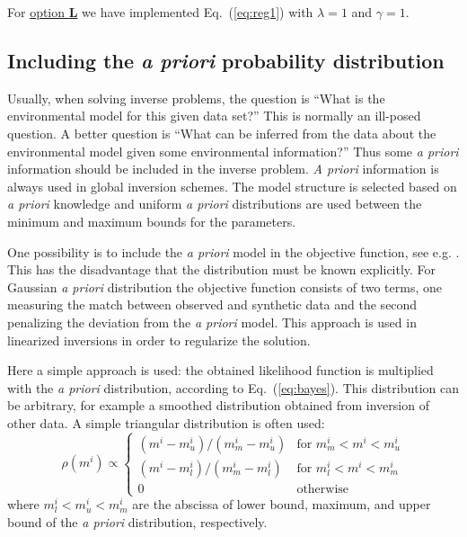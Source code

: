 \documentclass{saclantc}
\begin{document}
For \underline{option {\bf L}} we have implemented Eq.\ (\ref{eq:reg1}) with  $ \lambda=1$
  and $ \gamma=1$.

\subsection{Including the  {\it a priori} probability distribution}
\label{se:prior}


Usually, when solving inverse problems, the question is ``What is the
environmental model  for this given data set?'' This is normally an ill-posed
question. 
A better question is ``What can be inferred from the
data about the environmental model given some environmental
information?'' Thus 
 some {\it a priori} information should be included in the inverse problem. 
{\it A priori} information is always used in global inversion
schemes. The
model structure is selected based on {\it a
priori} knowledge and uniform {\it a priori}
distributions are used between the minimum and maximum bounds for the
parameters.

One possibility is to include the {\it a priori}  model in the objective
function, see e.g. \cite{tarantola,rajan:asa92}. This has the
disadvantage that the distribution must be known explicitly. 
For Gaussian {\it a priori} distribution  the objective function
consists of two terms, one measuring the match between observed and
 synthetic data and the second 
penalizing  the deviation from the {\it a priori} model. This approach
is  used in linearized inversions in order to regularize the solution.


Here  a  simple approach is used: the obtained likelihood function
is multiplied with the {\it a priori} distribution, according to
Eq.~(\ref{eq:bayes}). This
distribution can be arbitrary, for example a smoothed distribution obtained
from inversion of other data. 
A simple triangular distribution is often used:
\begin{equation}
\rho( m^i) \propto
\left\{ 
 \begin{array}{ll}
 ({m^i - m^i_u})/({m^i_m - m^i_u})  & \mbox{for $m^i_m < m^i < m^i_u$}\\ 
 ({m^i - m^i_l})/({m^i_m - m^i_l})  & \mbox{for $m^i_l < m^i < m^i_m$}\\ 
 0 & \mbox{otherwise} 
 \end{array}
\right. 
\label{eq:apri}
\end{equation}
where $m^i_l < m^i_u < m^i_m$ are the abscissa of 
lower bound, maximum, and upper bound of the {\it a
     priori\/} distribution, respectively.
\end{document}
